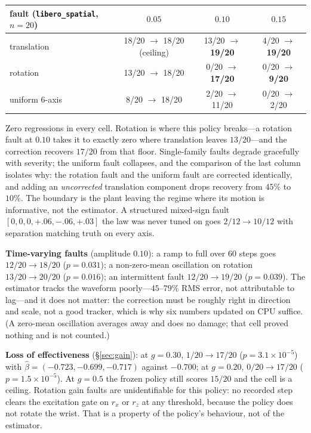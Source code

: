 \documentclass{article}
\newcommand{\code}[1]{\texttt{\small #1}}
\begin{document}
\begin{center}\small
\begin{tabular}{lccc}
\toprule
fault (\code{libero\_spatial}, $n=20$) & $0.05$ & $0.10$ & $0.15$ \\
\midrule
translation & 18/20 $\to$ 18/20 (ceiling) & 13/20 $\to$ \textbf{19/20} & 4/20 $\to$ \textbf{19/20} \\
rotation    & 13/20 $\to$ 18/20 & 0/20 $\to$ \textbf{17/20} & 0/20 $\to$ \textbf{9/20} \\
uniform 6-axis & 8/20 $\to$ 18/20 & 2/20 $\to$ 11/20 & 0/20 $\to$ 2/20 \\
\bottomrule
\end{tabular}
\end{center}

Zero regressions in every cell. Rotation is where this policy breaks---a rotation fault at
$0.10$ takes it to exactly zero where translation leaves $13/20$---and the correction
recovers $17/20$ from that floor. Single-family faults degrade gracefully with severity; the
uniform fault collapses, and the comparison of the last column isolates why: the rotation
fault and the uniform fault are corrected identically, and adding an \emph{uncorrected}
translation component drops recovery from $45\%$ to $10\%$. The boundary is the plant
leaving the regime where its motion is informative, not the estimator. A structured
mixed-sign fault $[0,0,0,+.06,-.06,+.03]$ the law was never tuned on goes $2/12\to10/12$ with
separation matching truth on every axis.

\textbf{Time-varying faults} (amplitude $0.10$): a ramp to full over 60 steps goes
$12/20\to18/20$ ($p=0.031$); a non-zero-mean oscillation on rotation $13/20\to20/20$
($p=0.016$); an intermittent fault $12/20\to19/20$ ($p=0.039$). The estimator tracks the
waveform poorly---$45$--$79\%$ RMS error, not attributable to lag---and it does not matter:
the correction must be roughly right in direction and scale, not a good tracker, which is
why six numbers updated on CPU suffice. (A zero-mean oscillation averages away and does no
damage; that cell proved nothing and is not counted.)

\textbf{Loss of effectiveness} (\S\ref{sec:gain}): at $g=0.30$, $1/20\to17/20$
($p=3.1\times10^{-5}$) with $\hat\beta = (-0.723,-0.699,-0.717)$ against $-0.700$; at
$g=0.20$, $0/20\to17/20$ ($p=1.5\times10^{-5}$). At $g=0.5$ the frozen policy still scores
$15/20$ and the cell is a ceiling. Rotation gain faults are unidentifiable for this policy:
no recorded step clears the excitation gate on $r_x$ or $r_z$ at any threshold, because the
policy does not rotate the wrist. That is a property of the policy's behaviour, not of the
estimator.
\end{document}
